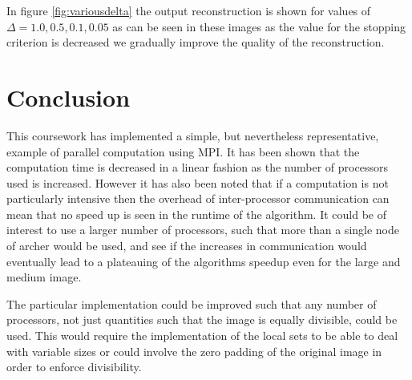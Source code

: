\documentclass[12pt]{article}
\begin{document}
In figure \ref{fig:variousdelta} the output reconstruction is shown for values of $\Delta = 1.0,0.5,0.1,0.05$ as can be seen in these images as the value for the stopping criterion is decreased we gradually improve the quality of the reconstruction. 

\section{Conclusion}

This coursework has implemented a simple, but nevertheless representative, example of parallel computation using MPI. It has been shown that the computation time is decreased in a linear fashion as the number of processors used is increased. However it has also been noted that if a computation is not particularly intensive then the overhead of inter-processor communication can mean that no speed up is seen in the runtime of the algorithm. It could be of interest to use a larger number of processors, such that more than a single node of archer would be used, and see if the increases in communication would eventually lead to a plateauing of the algorithms speedup even for the large and medium image.

The particular implementation could be improved such that any number of processors, not just quantities such that the image is equally divisible, could be used. This would require the implementation of the local sets to be able to deal with variable sizes or could involve the zero padding of the original image in order to enforce divisibility. 
\end{document}
